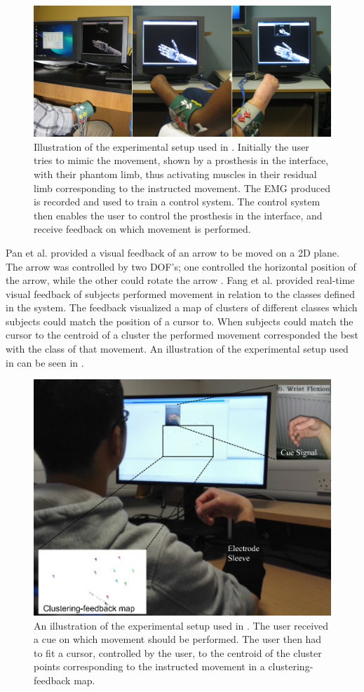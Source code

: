 \begin{figure}[H]                 
	\includegraphics[width=.8\textwidth]{figures/xBackground/PowellUserTraining}  
	\caption{Illustration of the experimental setup used in \cite{Powell2014}. Initially the user tries to mimic the movement, shown by a prosthesis in the interface, with their phantom limb, thus activating muscles in their residual limb corresponding to the instructed movement. The EMG produced is recorded and used to train a control system. The control system then enables the user to control the prosthesis in the interface, and receive feedback on which movement is performed.}
	\label{fig:PowellUserTraining} 
\end{figure}

Pan et al. \cite{Pan2017} provided a visual feedback of an arrow to be moved on a 2D plane. The arrow was controlled by two DOF's; one controlled the horizontal position of the arrow, while the other could rotate the arrow \cite{Pan2017}. Fang et al. \cite{Fang2017} provided real-time visual feedback of subjects performed movement in relation to the classes defined in the system. The feedback visualized a map of clusters of different classes which subjects could match the position of a cursor to. When subjects could match the cursor to the centroid of a cluster the performed movement corresponded the best with the class of that movement. \cite{Fang2017} An illustration of the experimental setup used in \cite{Fang2017} can be seen in .

\begin{figure}[H]                 
	\includegraphics[width=.7\textwidth]{figures/xBackground/FangUserTraining}  
	\caption{An illustration of the experimental setup used in \cite{Fang2017}. The user received a cue on which movement should be performed. The user then had to fit a cursor, controlled by the user, to the centroid of the cluster points corresponding to the instructed movement in a clustering-feedback map.}
	\label{fig:FangUserTraining} 
\end{figure}


